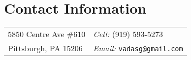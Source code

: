 \section{\sc Contact Information} %
\vspace{.05in}
\begin{tabular}{@{}p{2.8in}p{2.8in}}
5850 Centre Ave \#610                          & {\it Cell:}    (919) 593-5273 \\
Pittsburgh, PA 15206                          & {\it Email:}  \texttt{vadasg@gmail.com}\\        
\end{tabular}
